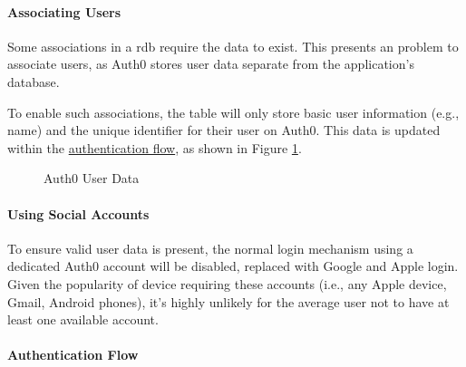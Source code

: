 
\paragraph{Associating Users}
Some associations in a \gls{rdb} require the data to exist.
This presents an problem to associate users, as Auth0
stores user data separate from the application's database.

To enable such associations, the  table will
only store basic user information (e.g., name) and the
unique identifier for their user on Auth0.
This data is updated within the
\hyperref[p:authFlow]{authentication flow}, as shown in
Figure \ref{fig:auth0Data}.

\begin{figure}
  
  \caption{Auth0 User Data}
  \label{fig:auth0Data}
\end{figure}

\paragraph{Using Social Accounts}
To ensure valid user data is present, the normal login
mechanism using a dedicated Auth0 account will be disabled,
replaced with Google and Apple login.
Given the popularity of device requiring these accounts
(i.e., any Apple device, Gmail, Android phones), it's
highly unlikely for the average user not to have at least
one available account.

\paragraph{Authentication Flow}
\label{p:authFlow}

